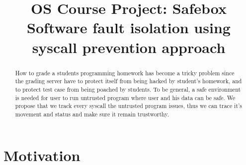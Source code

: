 \documentclass[conference,compsoc]{IEEEtran}
\begin{document}
\title{
	OS Course Project: Safebox\\ 
	Software fault isolation using syscall prevention approach
}


\author{
\and
}

\maketitle

\begin{abstract}
	How to grade a students programming homework has become a tricky problem since the grading server have to protect itself from being hacked by student's homework, and to protect test case from being poached by students. 
	To be general, a safe environment is needed for user to run untrusted program where user and his data can be safe. 
	We propose that we track every syscall the untrusted program issues, thus we can trace it's movement and status and make sure it remain trustworthy. 
\end{abstract}

\section{Motivation}
\end{document}

